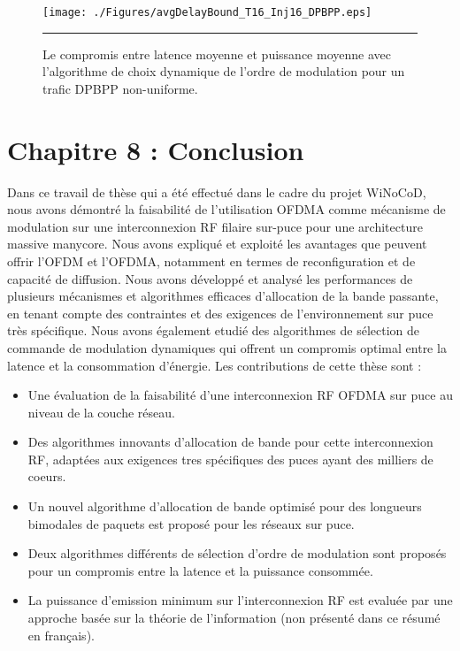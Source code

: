\begin{figure}[htbp]
  \centering
    \texttt{[image: ./Figures/avgDelayBound\_T16\_Inj16\_DPBPP.eps]}
    \rule{35em}{0.5pt}
  \caption[Le compromis entre latence moyenne et puissance moyenne avec l'algorithme de choix dynamique de l'ordre de modulation pour un trafic DPBPP non-uniforme.]{Le compromis entre latence moyenne et puissance moyenne avec l'algorithme de choix dynamique de l'ordre de modulation pour un trafic DPBPP non-uniforme.}
  \label{fig:Electron}
\end{figure}

\section*{Chapitre 8 : Conclusion}

Dans ce travail de thèse qui a été effectué dans le cadre du projet WiNoCoD, nous avons démontré la faisabilité de l'utilisation OFDMA comme mécanisme de modulation sur une interconnexion RF filaire sur-puce pour une architecture massive manycore. Nous avons expliqué et exploité les avantages que peuvent offrir l’OFDM et l’OFDMA, notamment en termes de reconfiguration et de capacité de diffusion. Nous avons développé et analysé les performances de plusieurs mécanismes et algorithmes efficaces d'allocation de la bande passante, en tenant compte des contraintes et des exigences de l'environnement sur puce très spécifique. Nous avons également etudié des algorithmes de sélection de commande de modulation dynamiques qui offrent un compromis optimal entre la latence et la consommation d'énergie. Les contributions de cette thèse sont :

\begin{itemize}
  \item Une évaluation de la faisabilité d'une interconnexion RF OFDMA sur puce au niveau de la couche réseau. 
  \item Des algorithmes innovants d'allocation de bande pour cette interconnexion RF, adaptées aux exigences tres spécifiques des puces ayant des milliers de coeurs.
  \item Un nouvel algorithme d'allocation de bande optimisé pour des longueurs bimodales de paquets est proposé pour les réseaux sur puce.
  \item Deux algorithmes différents de sélection d'ordre de modulation sont proposés pour un compromis entre la latence et la puissance consommée.
  \item La puissance d'emission minimum sur l'interconnexion RF est evaluée par une approche basée sur la théorie de l'information (non présenté dans ce résumé en français).

\end{itemize}

